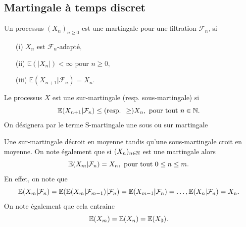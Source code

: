 \subsection{Martingale à temps discret}
\begin{definition}
Un processus $(X_n)_{n\geq0}$ est une martingale pour une filtration $\mathcal{F}_n$, si
\begin{itemize}
  \item[(i)] $X_n$ est $\mathcal{F}_n$-adapté,
  \item[(ii)] $\mathbb{E}(|X_n|)<\infty\text{ pour }n\geq0$,
  \item[(iii)] $\mathbb{E}(X_{n+1}|\mathcal{F}_{n}) = X_{n}$.
\end{itemize} 
\end{definition}
\begin{definition}
Le processus $X$ est une sur-martingale (resp. sous-martingale) si
    $$
    \mathbb{E}(X_{n+1}|\mathcal{F}_n) \leq (\text{resp. } \geq ) X_n,\text{ pour tout } n\in \mathbb{N}.
    $$
    On désignera par le terme S-martingale une sous ou sur martingale
\end{definition}
\begin{remark}    
Une sur-martingale décroit en moyenne tandis qu'une sous-martingale croit en moyenne. On note également que si $(X_n)_{n\in \mathbb{N}}$ est une martingale alors
$$
\mathbb{E}(X_m|\mathcal{F}_n) = X_n,\text{ pour tout }0\leq n\leq m.
$$
En effet, on note que 
$$
\mathbb{E}(X_m|\mathcal{F}_n) = \mathbb{E}(\mathbb{E}(X_m|\mathcal{F}_{m-1})|\mathcal{F}_n) = \mathbb{E}(X_{m-1}|\mathcal{F}_n) =\ldots, \mathbb{E}(X_{n}|\mathcal{F}_n) = X_n.
$$
On note également que cela entraine
$$
\mathbb{E}(X_m)=\mathbb{E}(X_n)=\mathbb{E}(X_0).
$$
\end{remark}
